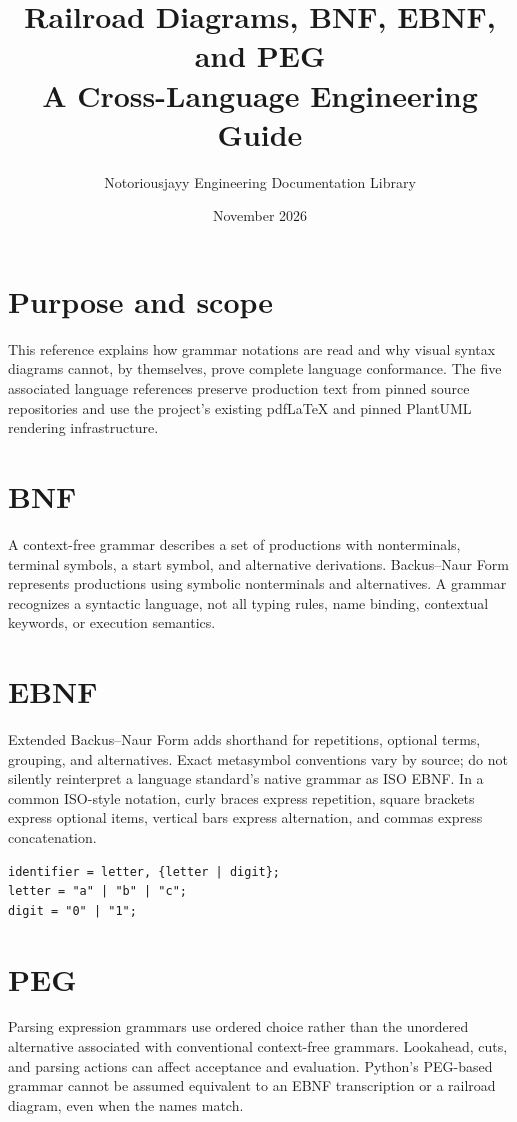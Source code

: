 \documentclass[11pt,letterpaper]{article}
\title{Railroad Diagrams, BNF, EBNF, and PEG\\A Cross-Language Engineering Guide}
\author{Notoriousjayy Engineering Documentation Library}
\date{November 2026}
\begin{document}
\maketitle
\tableofcontents
\section{Purpose and scope}
This reference explains how grammar notations are read and why visual
syntax diagrams cannot, by themselves, prove complete language conformance.
The five associated language references preserve production text from
pinned source repositories and use the project's existing pdfLaTeX
and pinned PlantUML rendering infrastructure.

\section{BNF}
A context-free grammar describes a set of productions with
nonterminals, terminal symbols, a start symbol, and alternative derivations.
Backus--Naur Form represents productions using symbolic nonterminals and
alternatives. A grammar recognizes a syntactic language, not all typing
rules, name binding, contextual keywords, or execution semantics.

\section{EBNF}
Extended Backus--Naur Form adds shorthand for repetitions, optional terms,
grouping, and alternatives. Exact metasymbol conventions vary by source;
do not silently reinterpret a language standard's native grammar as ISO EBNF.
In a common ISO-style notation, curly braces express repetition, square
brackets express optional items, vertical bars express alternation,
and commas express concatenation.
\begin{lstlisting}
identifier = letter, {letter | digit};
letter = "a" | "b" | "c";
digit = "0" | "1";
\end{lstlisting}

\section{PEG}
Parsing expression grammars use ordered choice rather than the
unordered alternative associated with conventional context-free grammars.
Lookahead, cuts, and parsing actions can affect acceptance and evaluation.
Python's PEG-based grammar cannot be assumed equivalent to an EBNF
transcription or a railroad diagram, even when the names match.
\end{document}
